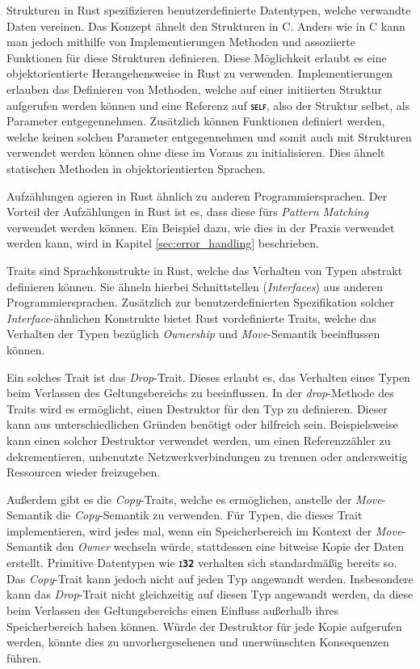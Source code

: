 Strukturen in Rust spezifizieren benutzerdefinierte Datentypen, welche verwandte Daten vereinen. Das Konzept
ähnelt den Strukturen in C. Anders wie in C kann man jedoch mithilfe von Implementierungen Methoden und assoziierte
Funktionen für diese Strukturen definieren.
Diese Möglichkeit erlaubt es eine objektorientierte Herangehensweise in Rust zu verwenden.
Implementierungen erlauben das Definieren von Methoden, welche auf einer initiierten Struktur aufgerufen werden 
können und eine Referenz auf \texttt{\textsc{\textbf{self}}}, also der Struktur selbst, als Parameter entgegennehmen.
Zusätzlich können Funktionen definiert werden, welche keinen solchen Parameter entgegennehmen und somit auch mit
Strukturen verwendet werden können ohne diese im Voraus zu initialisieren.
Dies ähnelt statischen Methoden in objektorientierten Sprachen.\cite{rustBook}

Aufzählungen agieren in Rust ähnlich zu anderen Programmiersprachen. Der Vorteil der Aufzählungen in Rust ist es,
dass diese fürs \textit{Pattern Matching} verwendet werden können.
Ein Beispiel dazu, wie dies in der Praxis verwendet
werden kann, wird in Kapitel \ref{sec:error_handling} beschrieben.
\cite{rustBook}

Traits sind Sprachkonstrukte in Rust, welche das Verhalten von Typen abstrakt definieren können. Sie ähneln 
hierbei Schnittstellen (\textit{Interfaces}) aus anderen Programmiersprachen.
Zusätzlich zur benutzerdefinierten Spezifikation
solcher \textit{Interface}-ähnlichen Konstrukte bietet Rust vordefinierte Traits, welche das Verhalten der Typen
bezüglich \textit{Ownership} und \textit{Move}-Semantik beeinflussen können.\cite{rustBook}

Ein solches Trait ist das \textit{Drop}-Trait. Dieses erlaubt es, das Verhalten eines Typen beim Verlassen des
Geltungsbereichs zu beeinflussen. In der \textit{drop}-Methode des Traits wird es ermöglicht, einen Destruktor
für den Typ zu definieren. Dieser kann aus unterschiedlichen Gründen benötigt oder hilfreich sein.
Beispielsweise kann einen solcher Destruktor verwendet werden, 
um einen Referenzzähler zu dekrementieren, unbenutzte Netzwerkverbindungen
zu trennen oder andersweitig Ressourcen wieder freizugeben.\cite{rustBook}

Außerdem gibt es die \textit{Copy}-Traits, welche es ermöglichen, anstelle der \textit{Move}-Semantik die
\textit{Copy}-Semantik zu verwenden. Für Typen, die dieses Trait implementieren, wird jedes mal, wenn ein
Speicherbereich im Kontext der \textit{Move}-Semantik den \textit{Owner} wechseln würde,
stattdessen eine bitweise Kopie der Daten erstellt. Primitive Datentypen wie \texttt{\textsc{\textbf{i32}}}
verhalten sich standardmäßig bereits so. Das \textit{Copy}-Trait kann jedoch nicht auf jeden Typ
angewandt werden. Insbesondere kann das \textit{Drop}-Trait nicht gleichzeitig auf diesen Typ angewandt werden,
da diese beim Verlassen des Geltungsbereichs einen Einfluss außerhalb ihres Speicherbereich haben können.
Würde der Destruktor für jede Kopie aufgerufen werden, könnte dies zu unvorhergesehenen und
unerwünschten Konsequenzen führen.\cite{rustBook}\cite{rustDocCopy}

